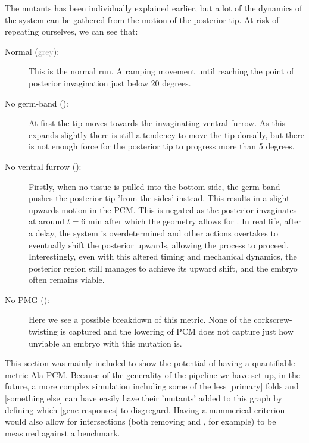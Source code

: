 \begin{figure}[H]
    \label{fig:PCM-mutants}
\end{figure}


The mutants has been individually explained earlier, but a lot of the dynamics of the system can be gathered from the motion of the posterior tip. At risk of repeating ourselves, we can see that:\\
\begin{description}
    \item[Normal (\textcolor{darkgray}{grey}):] This is the normal run. A ramping movement until reaching the point of posterior invagination just below 20 degrees. 
    \item[No germ-band ():] At first the tip moves towards the invaginating ventral furrow. As this expands slightly there is still a tendency to move the tip dorsally, but there is not enough force for the posterior tip to progress more than 5 degrees. 
    \item[No ventral furrow ():] Firstly, when no tissue is pulled into the bottom side, the germ-band pushes the posterior tip 'from the sides' instead. This results in a slight upwards motion in the PCM. This is negated as the posterior invaginates at around $t=6\text{ min}$ after which the geometry allows for . In real life, after a delay, the system is overdetermined and other actions overtakes to eventually shift the posterior upwards, allowing the process to proceed. Interestingly, even with this altered timing and mechanical dynamics, the posterior region still manages to achieve its upward shift, and the embryo often remains viable. 
    \item[No PMG ():]  Here we see a possible breakdown of this metric. None of the corkscrew-twisting is captured and the lowering of PCM does not capture just how unviable an embryo with this mutation is.  
\end{description}

This section was mainly included to show the potential of having a quantifiable metric Ala PCM. Because of the generality of the pipeline we have set up, in the future, a more complex simulation including some of the less [primary] folds and [something else] can have easily have their 'mutants' added to this graph by defining which [gene-responses] to disgregard. Having a nummerical criterion would also allow for intersections (both removing  and , for example) to be measured against a benchmark. 



